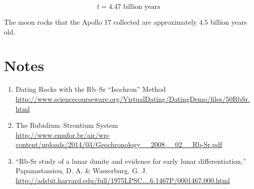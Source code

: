\documentclass[11pt]{article}
\begin{document}
\[
t = 4.47 \text{ billion years}
\]

The moon rocks that the Apollo 17 collected are approximately $4.5$ billion years old.

\section*{Notes}

\begin{enumerate}
    \item Dating Rocks with the Rb--Sr ``Isochron'' Method\\
    \url{http://www.sciencecourseware.org/VirtualDating/DatingDemo/files/50RbSr.html}

    \item The Rubidium--Strontium System\\
    \url{http://www.emufor.br/air/wp-content/uploads/2014/03/Geochronology__2008__02__Rb-Sr.pdf}

    \item ``Rb-Sr study of a lunar dunite and evidence for early lunar differentiation,'' Papanastassiou, D. A. \& Wasserburg, G. J.\\
    \url{http://adsbit.harvard.edu/full/1975LPSC....6.1467P/0001467.000.html}
\end{enumerate}
\end{document}
